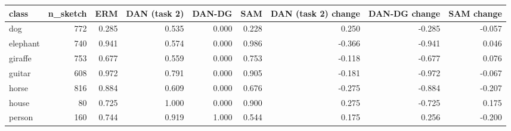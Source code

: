 \begin{tabular}{lrrrrrrrr}
\toprule
class & n\_sketch & ERM & DAN (task 2) & DAN-DG & SAM & DAN (task 2) change & DAN-DG change & SAM change \\
\midrule
dog & 772 & 0.285 & 0.535 & 0.000 & 0.228 & 0.250 & -0.285 & -0.057 \\
elephant & 740 & 0.941 & 0.574 & 0.000 & 0.986 & -0.366 & -0.941 & 0.046 \\
giraffe & 753 & 0.677 & 0.559 & 0.000 & 0.753 & -0.118 & -0.677 & 0.076 \\
guitar & 608 & 0.972 & 0.791 & 0.000 & 0.905 & -0.181 & -0.972 & -0.067 \\
horse & 816 & 0.884 & 0.609 & 0.000 & 0.676 & -0.275 & -0.884 & -0.207 \\
house & 80 & 0.725 & 1.000 & 0.000 & 0.900 & 0.275 & -0.725 & 0.175 \\
person & 160 & 0.744 & 0.919 & 1.000 & 0.544 & 0.175 & 0.256 & -0.200 \\
\bottomrule
\end{tabular}
